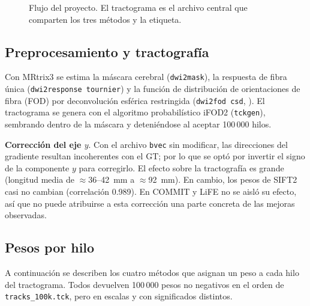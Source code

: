 \documentclass[11pt,a4paper]{article}
\newcommand{\code}[1]{\texttt{\small #1}}
\begin{document}
\begin{figure}[H]
\caption{Flujo del proyecto. El tractograma es el archivo central que comparten los tres m\'etodos y la etiqueta.}
\label{fig:flujo}
\end{figure}

\subsection{Preprocesamiento y tractograf\'ia}

Con MRtrix3 \cite{tournier2019} se estima la m\'ascara cerebral (\code{dwi2mask}), la
respuesta de fibra \'unica (\code{dwi2response tournier}) y la funci\'on de distribuci\'on de
orientaciones de fibra (FOD) por deconvoluci\'on esf\'erica restringida
(\code{dwi2fod csd}, \cite{tournier2007}). El tractograma se genera con el algoritmo
probabil\'istico iFOD2 \cite{tournier2010} (\code{tckgen}), sembrando dentro de la m\'ascara
y deteni\'endose al aceptar 100\,000 hilos.

\textbf{Correcci\'on del eje $y$}. Con el archivo \code{bvec} sin modificar, las
direcciones del gradiente resultan incoherentes con el GT; por lo que se optó por invertir el signo de la
componente $y$ para corregirlo. El efecto sobre la tractograf\'ia es grande (longitud media de
$\approx$36--42~mm a $\approx$92~mm). En cambio, los pesos de SIFT2 casi no cambian
(correlaci\'on 0.989). En COMMIT y LiFE no se aisl\'o su efecto, as\'i que no puede
atribuirse a esta correcci\'on una parte concreta de las mejoras observadas.

\subsection{Pesos por hilo}

A continuación se describen los cuatro m\'etodos que asignan un peso a cada hilo del tractograma. Todos devuelven 100\,000 pesos no negativos en el orden de \code{tracks\_100k.tck}, pero en escalas y con significados distintos.
\end{document}
